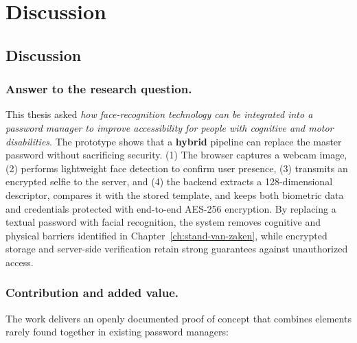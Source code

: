 
\chapter{Discussion}%
\label{ch:conclusie}


\section{Discussion}

\subsection{Answer to the research question.}
This thesis asked \emph{how face-recognition technology can be integrated into a password manager to improve accessibility for people with cognitive and motor disabilities}.  
The prototype shows that a \textbf{hybrid} pipeline can replace the master password without sacrificing security.  
(1) The browser captures a webcam image, (2) performs lightweight face detection to confirm user presence, (3) transmits an encrypted selfie to the server, and (4) the backend extracts a 128-dimensional descriptor, compares it with the stored template, and keeps both biometric data and credentials protected with end-to-end AES-256 encryption.  
By replacing a textual password with facial recognition, the system removes cognitive and physical barriers identified in Chapter~\ref{ch:stand-van-zaken}, while encrypted storage and server-side verification retain strong guarantees against unauthorized access.

\subsection{Contribution and added value.}
The work delivers an openly documented proof of concept that combines elements rarely found together in existing password managers:

